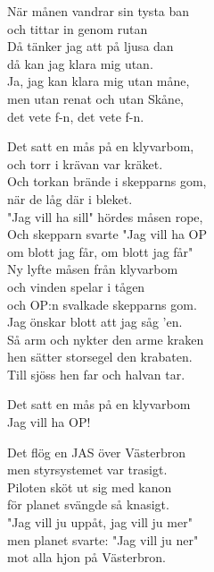 \documentclass[a6paper,10pt]{article}
\begin{document}
\setlength{\oddsidemargin}{-0.47in}
\noindent
\begin{center}
\end{center}
När månen vandrar sin tysta ban \\
och tittar in genom rutan \\
Då tänker jag att på ljusa dan \\
då kan jag klara mig utan. \\
Ja, jag kan klara mig utan måne, \\
men utan renat och utan Skåne, \\
det vete f-n, det vete f-n. 
\begin{center}
\end{center}
Det satt en mås på en klyvarbom, \\
och torr i krävan var kräket. \\
Och torkan brände i skepparns gom, \\
när de låg där i bleket. \\
"Jag vill ha sill" hördes måsen rope, \\
Och skepparn svarte "Jag vill ha OP \\
om blott jag får, om blott jag får" 
\vspace{5pt}\\
Ny lyfte måsen från klyvarbom \\
och vinden spelar i tågen \\
och OP:n svalkade skepparns gom. \\
Jag önskar blott att jag såg 'en. \\
Så arm och nykter den arme kraken \\
hen sätter storsegel den krabaten. \\
Till sjöss hen far och halvan tar. 

\begin{center}
\end{center}
Det satt en mås på en klyvarbom\\
Jag vill ha OP! 

\newpage
\setlength{\oddsidemargin}{-0.37in}
\noindent
\begin{center}
\end{center}
Det flög en JAS över Västerbron \\
men styrsystemet var trasigt. \\
Piloten sköt ut sig med kanon \\
för planet svängde så knasigt. \\
"Jag vill ju uppåt, jag vill ju mer"\\
men planet svarte: "Jag vill ju ner"\\
mot alla hjon på Västerbron. 
\end{document}
